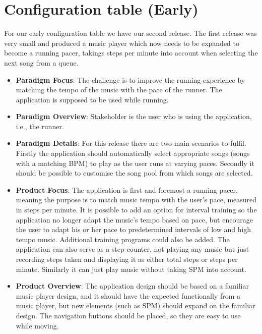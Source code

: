 \section{Configuration table (Early)}
For our early configuration table we have our second release. The first release was very small and produced a music player which now needs to be expanded to become a running pacer, takings steps per minute into account when selecting the next song from a queue.




\begin{itemize}
\item \textbf{Paradigm Focus}: The challenge is to improve the running experience by matching the tempo of the music with the pace of the runner. The application is supposed to be used while running.

\item \textbf{Paradigm Overview}: Stakeholder is the user who is using the application, i.e., the runner.

\item \textbf{Paradigm Details}: For this release there are two main scenarios to fulfil. Firstly the application should automatically select appropriate songs (songs with a matching BPM) to play as the user runs at varying paces. Secondly it should be possible to customise the song pool from which songs are selected.

\item \textbf{Product Focus}: The application is first and foremost a running pacer, meaning the purpose is to match music tempo with the user's pace, measured in steps per minute. It is possible to add an option for interval training so the application no longer adapt the music's tempo based on pace, but encourage the user to adapt his or her pace to predetermined intervals of low and high tempo music. Additional training programs could also be added. The application can also serve as a step counter, not playing any music but just recording steps taken and displaying it as either total steps or steps per minute. Similarly it can just play music without taking SPM into account.

\item \textbf{Product Overview}: The application design should be based on a familiar music player design, and it should have the expected functionally from a music player, but new elements (such as SPM) should expand on the familiar design. The navigation buttons should be placed, so they are easy to use while moving.


\end{itemize}
